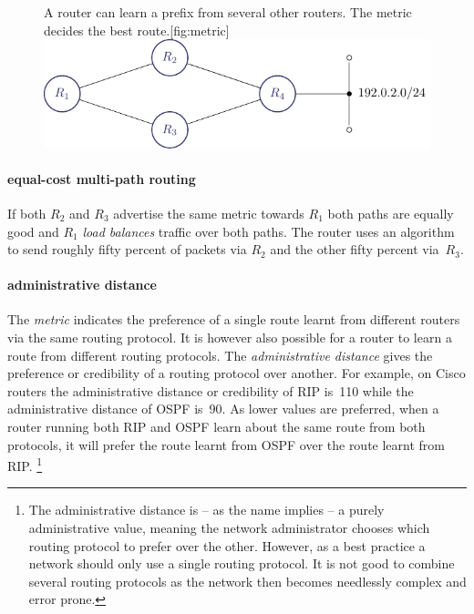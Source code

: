 \begin{figure}
\begin{sidecaption}{A router can learn a prefix from several other routers. The metric decides the best route.}[fig:metric]
\centering
\includegraphics[width=\textwidth]{images/ip/metric.pdf}
\end{sidecaption}
\end{figure}


\paragraph{equal-cost multi-path routing}
If both $R_2$ and $R_3$ advertise the same metric towards $R_1$ both paths are equally good and $R_1$ \emph{load balances} traffic over both paths.
The router uses an algorithm to send roughly fifty percent of packets via $R_2$ and the other fifty percent via~$R_3$.

\paragraph{administrative distance}
The \emph{metric} indicates the preference of a single route learnt from different routers via the same routing protocol.
It is however also possible for a router to learn a route from different routing protocols.
The \emph{administrative distance} gives the preference or credibility of a routing protocol over another.
For example, on Cisco routers the administrative distance or credibility of \acs{RIP} is~110 while the administrative distance of \acs{OSPF} is~90.
As lower values are preferred, when a router running both \acs{RIP} and \acs{OSPF} learn about the same route from both protocols, it will prefer the route learnt from \acs{OSPF} over the route learnt from \acs{RIP}.%
   \footnote{%
      The administrative distance is -- as the name implies -- a purely administrative value, meaning the network administrator chooses which routing protocol to prefer over the other.
      However, as a best practice a network should only use a single routing protocol.
      It is not good to combine several routing protocols as the network then becomes needlessly complex and error prone.
   }

